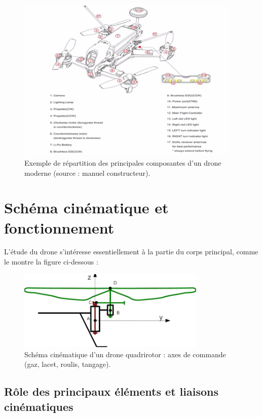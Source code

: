 \documentclass[a4paper,12pt]{report}
\begin{document}
\begin{figure}[H]
    \centering
    \includegraphics[width=0.95\textwidth]{images/composantes_drone_exemple.png}
    \caption{Exemple de répartition des principales composantes d'un drone moderne (source : manuel constructeur).}
    \label{fig:composantes_drone_exemple}
\end{figure}

\section{Schéma cinématique et fonctionnement}

L'étude du drone s'intéresse essentiellement à la partie du corps principal, comme le montre la figure ci-dessous :

\begin{figure}[H]
    \centering
    \includegraphics[width=0.8\textwidth]{images/schema_cinematique_drone.png}
    \caption{Schéma cinématique d'un drone quadrirotor : axes de commande (gaz, lacet, roulis, tangage).}
    \label{fig:schema_cinematique_drone}
\end{figure}

\subsection*{Rôle des principaux éléments et liaisons cinématiques}
\end{document}
